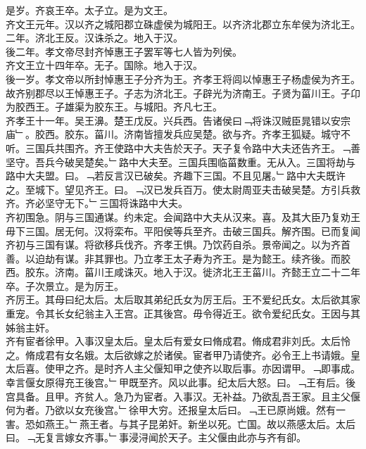 \documentclass{zhvt-classic}
\begin{document}
\hspace*{2em}是岁。齐哀王卒。太子立。是为文王。\\
\hspace*{2em}齐文王元年。汉以齐之城阳郡立硃虚侯为城阳王。以齐济北郡立东牟侯为济北王。\\
\hspace*{2em}二年。济北王反。汉诛杀之。地入于汉。\\
\hspace*{2em}後二年。孝文帝尽封齐悼惠王子罢军等七人皆为列侯。\\
\hspace*{2em}齐文王立十四年卒。无子。国除。地入于汉。\\
\hspace*{2em}後一岁。孝文帝以所封悼惠王子分齐为王。齐孝王将闾以悼惠王子杨虚侯为齐王。故齐别郡尽以王悼惠王子。子志为济北王。子辟光为济南王。子贤为菑川王。子卬为胶西王。子雄渠为胶东王。与城阳。齐凡七王。\\
\hspace*{2em}齐孝王十一年。吴王濞。楚王戊反。兴兵西。告诸侯曰﹁将诛汉贼臣晁错以安宗庙﹂。胶西。胶东。菑川。济南皆擅发兵应吴楚。欲与齐。齐孝王狐疑。城守不听。三国兵共围齐。齐王使路中大夫告於天子。天子复令路中大夫还告齐王。﹁善坚守。吾兵今破吴楚矣。﹂路中大夫至。三国兵围临菑数重。无从入。三国将劫与路中大夫盟。曰。﹁若反言汉已破矣。齐趣下三国。不且见屠。﹂路中大夫既许之。至城下。望见齐王。曰。﹁汉已发兵百万。使太尉周亚夫击破吴楚。方引兵救齐。齐必坚守无下。﹂三国将诛路中大夫。\\
\hspace*{2em}齐初围急。阴与三国通谋。约未定。会闻路中大夫从汉来。喜。及其大臣乃复劝王毋下三国。居无何。汉将栾布。平阳侯等兵至齐。击破三国兵。解齐围。已而复闻齐初与三国有谋。将欲移兵伐齐。齐孝王惧。乃饮药自杀。景帝闻之。以为齐首善。以迫劫有谋。非其罪也。乃立孝王太子寿为齐王。是为懿王。续齐後。而胶西。胶东。济南。菑川王咸诛灭。地入于汉。徙济北王王菑川。齐懿王立二十二年卒。子次景立。是为厉王。\\
\hspace*{2em}齐厉王。其母曰纪太后。太后取其弟纪氏女为厉王后。王不爱纪氏女。太后欲其家重宠。令其长女纪翁主入王宫。正其後宫。毋令得近王。欲令爱纪氏女。王因与其姊翁主奸。\\
\hspace*{2em}齐有宦者徐甲。入事汉皇太后。皇太后有爱女曰脩成君。脩成君非刘氏。太后怜之。脩成君有女名娥。太后欲嫁之於诸侯。宦者甲乃请使齐。必令王上书请娥。皇太后喜。使甲之齐。是时齐人主父偃知甲之使齐以取后事。亦因谓甲。﹁即事成。幸言偃女原得充王後宫。﹂甲既至齐。风以此事。纪太后大怒。曰。﹁王有后。後宫具备。且甲。齐贫人。急乃为宦者。入事汉。无补益。乃欲乱吾王家。且主父偃何为者。乃欲以女充後宫。﹂徐甲大穷。还报皇太后曰。﹁王已原尚娥。然有一害。恐如燕王。﹂燕王者。与其子昆弟奸。新坐以死。亡国。故以燕感太后。太后曰。﹁无复言嫁女齐事。﹂事浸浔闻於天子。主父偃由此亦与齐有卻。\\
\end{document}
